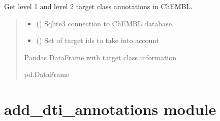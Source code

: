 \documentclass[letterpaper,10pt,english]{sphinxmanual}
\begin{document}
\begin{fulllineitems}
\label{\detokenize{add_chembl_target_class_annotations:add_chembl_target_class_annotations.get_target_class_table}}
\pysigstartsignatures
{}
\pysigstopsignatures
\sphinxAtStartPar
Get level 1 and level 2 target class annotations in ChEMBL.
\begin{quote}\begin{description}
\begin{itemize}
\item {} 
\sphinxAtStartPar
{} () \textendash{} Sqlite3 connection to ChEMBL database.

\item {} 
\sphinxAtStartPar
{} (\sphinxstyleliteralemphasis{\sphinxupquote{{[}}}\sphinxstyleliteralemphasis{\sphinxupquote{{]}}}) \textendash{} Set of target ids to take into account

\end{itemize}

\sphinxAtStartPar
Pandas DataFrame with target class information

\sphinxAtStartPar
pd.DataFrame

\end{description}\end{quote}

\end{fulllineitems}


\sphinxstepscope


\section{add\_dti\_annotations module}
\label{\detokenize{add_dti_annotations:module-add_dti_annotations}}\label{\detokenize{add_dti_annotations:add-dti-annotations-module}}\label{\detokenize{add_dti_annotations::doc}}
\end{document}
